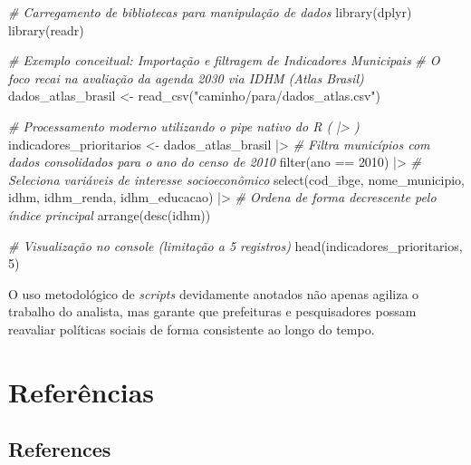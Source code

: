 \documentclass[
  brazilian,
  11pt,
  a4paper,
  open = right,
  twoside = true]{scrbook}
\newenvironment{Shaded}{\begin{snugshade}}{\end{snugshade}}
\newcommand{\CommentTok}[1]{\textcolor[rgb]{0.32,0.36,0.40}{\textit{#1}}}
\newcommand{\DecValTok}[1]{\textcolor[rgb]{0.55,0.29,0.58}{#1}}
\newcommand{\FunctionTok}[1]{\textcolor[rgb]{1.00,0.23,0.00}{#1}}
\newcommand{\NormalTok}[1]{\textcolor[rgb]{0.10,0.10,0.10}{#1}}
\newcommand{\OtherTok}[1]{\textcolor[rgb]{0.10,0.10,0.10}{#1}}
\newcommand{\SpecialCharTok}[1]{\textcolor[rgb]{0.85,0.00,0.31}{#1}}
\newcommand{\StringTok}[1]{\textcolor[rgb]{0.00,0.72,0.25}{#1}}
\begin{document}
\begin{Shaded}
\begin{Highlighting}[numbers=left,,]
\CommentTok{\# Carregamento de bibliotecas para manipulação de dados}
\FunctionTok{library}\NormalTok{(dplyr)}
\FunctionTok{library}\NormalTok{(readr)}

\CommentTok{\# Exemplo conceitual: Importação e filtragem de Indicadores Municipais}
\CommentTok{\# O foco recai na avaliação da agenda 2030 via IDHM (Atlas Brasil)}
\NormalTok{dados\_atlas\_brasil }\OtherTok{\textless{}{-}} \FunctionTok{read\_csv}\NormalTok{(}\StringTok{"caminho/para/dados\_atlas.csv"}\NormalTok{)}

\CommentTok{\# Processamento moderno utilizando o pipe nativo do R ( |\textgreater{} )}
\NormalTok{indicadores\_prioritarios }\OtherTok{\textless{}{-}}\NormalTok{ dados\_atlas\_brasil }\SpecialCharTok{|\textgreater{}}
  \CommentTok{\# Filtra municípios com dados consolidados para o ano do censo de 2010}
  \FunctionTok{filter}\NormalTok{(ano }\SpecialCharTok{==} \DecValTok{2010}\NormalTok{) }\SpecialCharTok{|\textgreater{}}
  \CommentTok{\# Seleciona variáveis de interesse socioeconômico}
  \FunctionTok{select}\NormalTok{(cod\_ibge, nome\_municipio, idhm, idhm\_renda, idhm\_educacao) }\SpecialCharTok{|\textgreater{}}
  \CommentTok{\# Ordena de forma decrescente pelo índice principal}
  \FunctionTok{arrange}\NormalTok{(}\FunctionTok{desc}\NormalTok{(idhm))}

\CommentTok{\# Visualização no console (limitação a 5 registros)}
\FunctionTok{head}\NormalTok{(indicadores\_prioritarios, }\DecValTok{5}\NormalTok{)}
\end{Highlighting}
\end{Shaded}

O uso metodológico de \emph{scripts} devidamente anotados não apenas
agiliza o trabalho do analista, mas garante que prefeituras e
pesquisadores possam reavaliar políticas sociais de forma consistente ao
longo do tempo.

\part{Referências}

\chapter*{References}\label{references}

\end{document}
